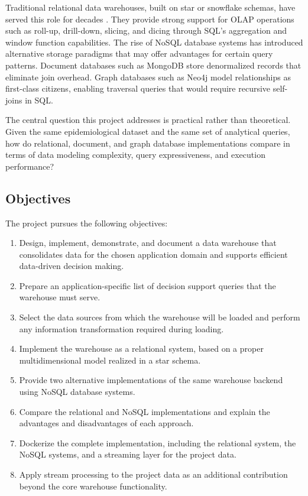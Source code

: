 \documentclass[12pt,a4paper]{article}
\begin{document}
Traditional relational data warehouses, built on star or snowflake schemas, have served this role for decades \cite{kimball2013}. They provide strong support for OLAP operations such as roll-up, drill-down, slicing, and dicing through SQL's aggregation and window function capabilities. The rise of NoSQL database systems has introduced alternative storage paradigms that may offer advantages for certain query patterns. Document databases such as MongoDB store denormalized records that eliminate join overhead. Graph databases such as Neo4j model relationships as first-class citizens, enabling traversal queries that would require recursive self-joins in SQL.

The central question this project addresses is practical rather than theoretical. Given the same epidemiological dataset and the same set of analytical queries, how do relational, document, and graph database implementations compare in terms of data modeling complexity, query expressiveness, and execution performance?

\subsection{Objectives}

The project pursues the following objectives:

\begin{enumerate}[leftmargin=2cm]
\item Design, implement, demonstrate, and document a data warehouse that consolidates data for the chosen application domain and supports efficient data-driven decision making.

\item Prepare an application-specific list of decision support queries that the warehouse must serve.

\item Select the data sources from which the warehouse will be loaded and perform any information transformation required during loading.

\item Implement the warehouse as a relational system, based on a proper multidimensional model realized in a star schema.

\item Provide two alternative implementations of the same warehouse backend using NoSQL database systems.

\item Compare the relational and NoSQL implementations and explain the advantages and disadvantages of each approach.

\item Dockerize the complete implementation, including the relational system, the NoSQL systems, and a streaming layer for the project data.

\item Apply stream processing to the project data as an additional contribution beyond the core warehouse functionality.
\end{enumerate}
\end{document}
